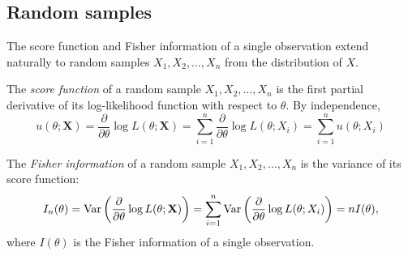 \subsection{Random samples}
The score function and Fisher information of a single observation extend naturally to random samples $X_1,X_2,\ldots,X_n$ from the distribution of $X$.


\begin{definition}
The \emph{score function} of a random sample $X_1,X_2,\ldots,X_n$ is the first partial derivative of its log-likelihood function with respect to $\theta$. By independence,
\[
u(\theta;\mathbf{X}) 
	= \frac{\partial}{\partial\theta} \log L(\theta;\mathbf{X})
	= \sum_{i=1}^n \frac{\partial}{\partial\theta} \log L(\theta;X_i)
	= \sum_{i=1}^n u(\theta;X_i)
\]
\end{definition}

\begin{definition}
The \emph{Fisher information} of a random sample $X_1,X_2,\ldots,X_n$ is the variance of its score function:
\[
I_n(\theta) 
	= \text{Var}\left(\frac{\partial}{\partial\theta}\log L(\theta;\mathbf{X})\right)
	= \sum_{i=1}^n\text{Var}\left(\frac{\partial}{\partial\theta}\log L(\theta;X_i)\right)
	= nI(\theta),
\]
where $I(\theta)$ is the Fisher information of a single observation.
\end{definition}


